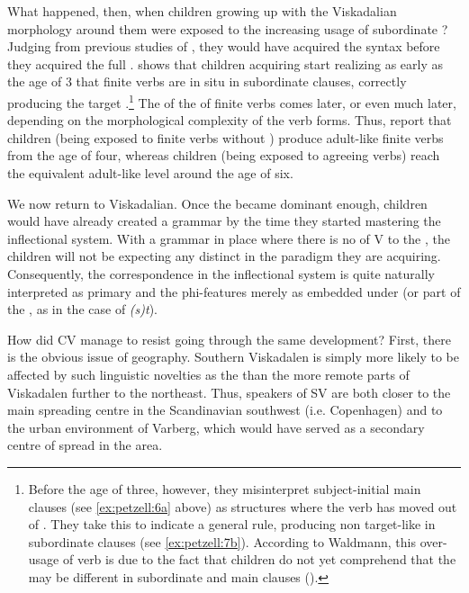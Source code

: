 \documentclass[output=paper,colorlinks,citecolor=brown,draft,draftmode]{langscibook}
\begin{document}
What happened, then, when children growing up with the Viskadalian morphology around them were exposed to the increasing usage of subordinate ? Judging from previous studies of , they would have acquired the syntax before they acquired the full . \citet{Waldmann2014} shows that children acquiring  start realizing as early as the age of 3 that finite verbs are in situ in subordinate clauses, correctly producing the target .\footnote{Before the age of three, however, they misinterpret subject-initial main clauses (see \ref{ex:petzell:6a} above) as  structures where the verb has moved out of . They take this to indicate a general  rule, producing non target-like  in subordinate clauses (see \ref{ex:petzell:7b}). According to Waldmann, this over-usage of verb  is due to the fact that children do not yet comprehend that the  may be different in subordinate and main clauses (\citeyear[62–65]{Waldmann2014}).} The  of the  of finite verbs comes later, or even much later, depending on the morphological complexity of the verb forms. Thus, \citet{RagnarsdottirEtAl1999} report that  children (being exposed to finite verbs without ) produce adult-like finite verbs from the age of four, whereas  children (being exposed to agreeing verbs) reach the equivalent adult-like level around the age of six.



We now return to Viskadalian. Once the  became dominant enough, children would have already created a  grammar by the time they started mastering the inflectional system. With a grammar in place where there is no  of V to the , the children will not be expecting any distinct  in the paradigm they are acquiring. Consequently, the  correspondence in the inflectional system is quite naturally interpreted as primary and the phi-features merely as embedded under  (or part of the , as in the case of \textit{(s)t}).



How did CV manage to resist going through the same development? First, there is the obvious issue of geography. Southern Viskadalen is simply more likely to be affected by such linguistic novelties as the  than the more remote parts of Viskadalen further to the northeast. Thus, speakers of SV are both closer to the main spreading centre in the Scandinavian southwest (i.e. Copenhagen) and to the urban environment of Varberg, which would have served as a secondary centre of spread in the area. 
\end{document}
